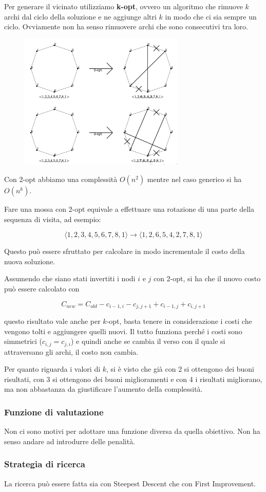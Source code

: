 Per generare il vicinato utilizziamo \textbf{k-opt}, ovvero un algoritmo che rimuove $k$ archi dal ciclo della soluzione e ne aggiunge altri $k$ in modo che ci sia sempre un ciclo. Ovviamente non ha senso rimuovere archi che sono consecutivi tra loro.

\begin{figure}[htbp]
	\centering
	\includegraphics[width=0.7\textwidth]{images/l7-fig-1.png}
\end{figure}

\noindent Con 2-opt abbiamo una complessità $O(n^2)$ mentre nel caso generico si ha $O(n^k)$.

Fare una mossa con 2-opt equivale a effettuare una rotazione di una parte della sequenza di visita, ad esempio:

$$
\langle 1,2,3,4,5,6,7,8,1 \rangle \to\langle 1,2,6,5,4,2,7,8,1 \rangle 
$$

\noindent Questo può essere sfruttato per calcolare in modo incrementale il costo della nuova soluzione.

Assumendo che siano stati invertiti i nodi $i$ e $j$ con 2-opt, si ha che il nuovo costo può essere calcolato con 

$$
C_{new} = C_{old} - c_{i-1, i} - c_{j, j+1} + c_{i-1,j} + c_{i, j+1}
$$

\noindent questo risultato vale anche per $k$-opt, basta tenere in considerazione i costi che vengono tolti e aggiungere quelli nuovi. Il tutto funziona perché i costi sono simmetrici ($c_{i,j} = c_{j,i}$) e quindi anche se cambia il verso con il quale si attraversano gli archi, il costo non cambia.

Per quanto riguarda i valori di $k$, si è visto che già con 2 si ottengono dei buoni risultati, con 3 si ottengono dei buoni miglioramenti e con 4 i risultati migliorano, ma non abbastanza da giustificare l'aumento della complessità.

\subsubsection{Funzione di valutazione}

Non ci sono motivi per adottare una funzione diversa da quella obiettivo. Non ha senso andare ad introdurre delle penalità.

\subsubsection{Strategia di ricerca}

La ricerca può essere fatta sia con Steepest Descent che con First Improvement.


